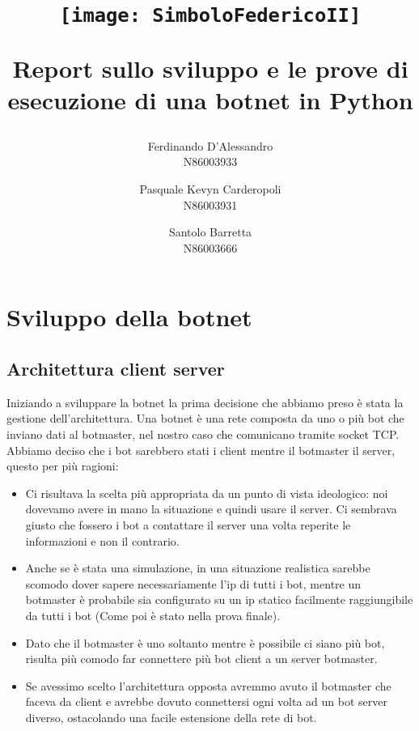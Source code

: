 \documentclass[a4paper]{report}
\begin{document}
\author {Ferdinando D'Alessandro\\N86003933\and Pasquale Kevyn Carderopoli \\ N86003931\and Santolo Barretta\\N86003666}
\title {
	\begin{figure}[hp]
		\centerline{\texttt{[image: SimboloFedericoII]}}
	\end{figure} Report sullo sviluppo e le prove di esecuzione di una botnet in Python }


\date{}
\maketitle

\tableofcontents

\chapter{Sviluppo della botnet}

\section{Architettura client server}

Iniziando a sviluppare la botnet la prima decisione che abbiamo preso è stata la gestione dell'architettura.
Una botnet è una rete composta da uno o più bot che inviano dati al botmaster, nel nostro caso che comunicano tramite socket TCP.\\
Abbiamo deciso che i bot sarebbero stati i client mentre il botmaster il server, questo per più ragioni:
\begin{itemize}
	\item Ci risultava la scelta più appropriata da un punto di vista ideologico: noi dovevamo avere in mano la situazione e quindi usare il server. Ci sembrava giusto che fossero i bot a contattare il server una volta reperite le informazioni e non il contrario.
	\item Anche se è stata una simulazione, in una situazione realistica sarebbe scomodo dover sapere necessariamente l'ip di tutti i bot, mentre un botmaster è probabile sia configurato su un ip statico facilmente raggiungibile da tutti i bot (Come poi è stato nella prova finale).
	\item Dato che il botmaster è uno soltanto mentre è possibile ci siano più bot, risulta più comodo far connettere più bot client a un server botmaster.
	\item Se avessimo scelto l'architettura opposta avremmo avuto il botmaster che faceva da client e avrebbe dovuto connettersi ogni volta ad un bot server diverso, ostacolando una facile estensione della rete di bot.
\end{itemize}
\end{document}
